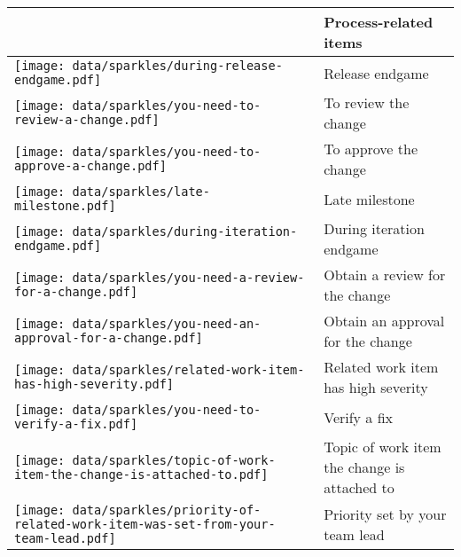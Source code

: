 \addtocounter{table}{1}
\begin{table}[t!]
\centering
\begin{tabular}{ll}
\toprule
\vspace{-2pt}& Process-related items\\
\midrule
\vspace{-2pt}\texttt{[image: data/sparkles/during-release-endgame.pdf]} & Release endgame\\
\vspace{-2pt}\texttt{[image: data/sparkles/you-need-to-review-a-change.pdf]} & To review the change\\
\vspace{-2pt}\texttt{[image: data/sparkles/you-need-to-approve-a-change.pdf]} & To approve the change\\
\vspace{-2pt}\texttt{[image: data/sparkles/late-milestone.pdf]} & Late milestone\\
\vspace{-2pt}\texttt{[image: data/sparkles/during-iteration-endgame.pdf]} & During iteration endgame\\
\vspace{-2pt}\texttt{[image: data/sparkles/you-need-a-review-for-a-change.pdf]} & Obtain a review for the change\\
\vspace{-2pt}\texttt{[image: data/sparkles/you-need-an-approval-for-a-change.pdf]} & Obtain an approval for the change\\
\vspace{-2pt}\texttt{[image: data/sparkles/related-work-item-has-high-severity.pdf]} & Related work item has high severity\\
\vspace{-2pt}\texttt{[image: data/sparkles/you-need-to-verify-a-fix.pdf]} & Verify a fix\\
\vspace{-2pt}\texttt{[image: data/sparkles/topic-of-work-item-the-change-is-attached-to.pdf]} & Topic of work item the change is attached to\\ 
\vspace{-2pt}\texttt{[image: data/sparkles/priority-of-related-work-item-was-set-from-your-team-lead.pdf]} & Priority set by your team lead\\

\end{tabular}
\end{table}
